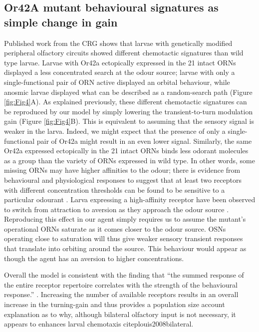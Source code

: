 \documentclass[10pt,a4paper]{article}
\begin{document}
\subsection{Or42A mutant behavioural signatures as simple change in gain}
Published work from the CRG shows that larvae with genetically modified peripheral olfactory circuits showed different chemotactic signatures than wild type larvae. Larvae with Or42a ectopically expressed in the 21 intact ORNs displayed a less concentrated search at the odour source; larvae with only a single-functional pair of ORN active displayed an orbital behaviour, while anosmic larvae displayed what can be described as a random-search path (Figure \ref{fig:Fig4}A).
 As explained previously, these different chemotactic signatures can be reproduced by our model by simply lowering the transient-to-turn modulation gain (Figure \ref{fig:Fig4}B). This is equivalent to assuming that the sensory signal is weaker in the larva. Indeed, we might expect that the presence of only a single-functional pair of Or42a might result in an even lower signal.
 Similarly, the same Or42a expressed ectopically in the 21 intact ORNs binds less odorant molecules as a group than the variety of ORNs expressed in wild type. In other words, some missing ORNs may have higher affinities to the odour; there is evidence from behavioural and physiological responses to suggest that at least two receptors with different concentration thresholds can be found to be sensitive to a particular odourant \citep{kreher2008translation}. 
 Larva expressing a high-affinity receptor have been observed to switch from attraction to aversion as they approach the odour source \citep{gomez2011active, kreher2008translation}. %
  Reproducing this effect in our agent simply requires us to assume the mutant's operational ORNs saturate as it comes closer to the odour source. OSNs operating close to saturation will thus give weaker sensory transient responses that translate into orbiting around the source. This behaviour would appear as though the agent has an aversion to higher concentrations.
 
 Overall the model is consistent with the finding that ``the summed response of the entire receptor repertoire correlates with the strength of the behavioural response.” \citep{kreher2008translation}. Increasing the number of available receptors results in an overall increase in the turning-gain and thus provides a population size account explanation as to why, although bilateral olfactory input is not necessary, it appears to enhances larval chemotaxis citep{louis2008bilateral}.
\end{document}
